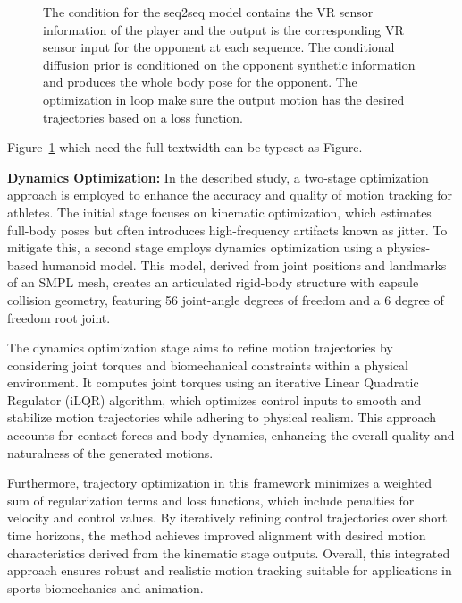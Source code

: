 \begin{figure}[htbp]
  \centering

  

  \caption{\label{fig:condtion-diffusion}
           The condition for the seq2seq model contains the VR sensor information of the player and the output is the corresponding VR sensor input for the opponent at each sequence. The conditional diffusion prior is conditioned on the opponent synthetic information and produces the whole body pose for the opponent. The optimization in loop make sure the output motion has the desired trajectories based on a loss function.}
\end{figure}

Figure~\ref{fig:condtion-diffusion} which need the full textwidth can be typeset as Figure.

\textbf{Dynamics Optimization:} In the described study, a two-stage optimization approach is employed to enhance the accuracy and quality of motion tracking for athletes. The initial stage focuses on kinematic optimization, which estimates full-body poses but often introduces high-frequency artifacts known as jitter. To mitigate this, a second stage employs dynamics optimization using a physics-based humanoid model. This model, derived from joint positions and landmarks of an SMPL mesh, creates an articulated rigid-body structure with capsule collision geometry, featuring 56 joint-angle degrees of freedom and a 6 degree of freedom root joint.

The dynamics optimization stage aims to refine motion trajectories by considering joint torques and biomechanical constraints within a physical environment. It computes joint torques using an iterative Linear Quadratic Regulator (iLQR) algorithm, which optimizes control inputs to smooth and stabilize motion trajectories while adhering to physical realism. This approach accounts for contact forces and body dynamics, enhancing the overall quality and naturalness of the generated motions.

Furthermore, trajectory optimization in this framework minimizes a weighted sum of regularization terms and loss functions, which include penalties for velocity and control values. By iteratively refining control trajectories over short time horizons, the method achieves improved alignment with desired motion characteristics derived from the kinematic stage outputs. Overall, this integrated approach ensures robust and realistic motion tracking suitable for applications in sports biomechanics and animation.

